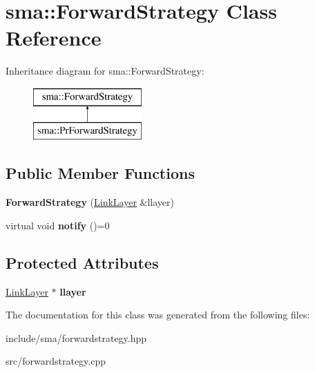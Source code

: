 \hypertarget{classsma_1_1ForwardStrategy}{\section{sma\-:\-:Forward\-Strategy Class Reference}
\label{classsma_1_1ForwardStrategy}
}
Inheritance diagram for sma\-:\-:Forward\-Strategy\-:\begin{figure}[H]
\begin{center}
\leavevmode
\includegraphics[height=2.000000cm]{classsma_1_1ForwardStrategy}
\end{center}
\end{figure}
\subsection*{Public Member Functions}
\begin{DoxyCompactItemize}
\item 
\hypertarget{classsma_1_1ForwardStrategy_a1fcfe45c9151af87d9c89b27bc3bd6f5}{{\bfseries Forward\-Strategy} (\hyperlink{classsma_1_1LinkLayer}{Link\-Layer} \&llayer)}\label{classsma_1_1ForwardStrategy_a1fcfe45c9151af87d9c89b27bc3bd6f5}

\item 
\hypertarget{classsma_1_1ForwardStrategy_a0a3f2d1ae1e3a845d9d563bbd4eba1f4}{virtual void {\bfseries notify} ()=0}\label{classsma_1_1ForwardStrategy_a0a3f2d1ae1e3a845d9d563bbd4eba1f4}

\end{DoxyCompactItemize}
\subsection*{Protected Attributes}
\begin{DoxyCompactItemize}
\item 
\hypertarget{classsma_1_1ForwardStrategy_a8e701f86c4fd501d0a4ba42566247c1d}{\hyperlink{classsma_1_1LinkLayer}{Link\-Layer} $\ast$ {\bfseries llayer}}\label{classsma_1_1ForwardStrategy_a8e701f86c4fd501d0a4ba42566247c1d}

\end{DoxyCompactItemize}


The documentation for this class was generated from the following files\-:\begin{DoxyCompactItemize}
\item 
include/sma/forwardstrategy.\-hpp\item 
src/forwardstrategy.\-cpp\end{DoxyCompactItemize}
